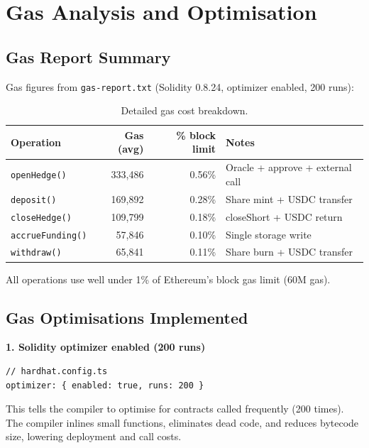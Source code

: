 \documentclass[11pt,a4paper]{article}
\begin{document}
\section{Gas Analysis and Optimisation}

\subsection{Gas Report Summary}

Gas figures from \texttt{gas-report.txt} (Solidity 0.8.24, optimizer enabled, 200 runs):

\begin{table}[h!]
\centering
\caption{Detailed gas cost breakdown.}
\begin{tabular}{@{}lrrl@{}}
\toprule
\textbf{Operation} & \textbf{Gas (avg)} & \textbf{\% block limit} & \textbf{Notes} \\
\midrule
\texttt{openHedge()}     & 333,486 & 0.56\% & Oracle + approve + external call \\
\texttt{deposit()}       & 169,892 & 0.28\% & Share mint + USDC transfer \\
\texttt{closeHedge()}    & 109,799 & 0.18\% & closeShort + USDC return \\
\texttt{accrueFunding()} &  57,846 & 0.10\% & Single storage write \\
\texttt{withdraw()}      &  65,841 & 0.11\% & Share burn + USDC transfer \\
\bottomrule
\end{tabular}
\end{table}

All operations use well under 1\% of Ethereum's block gas limit (60M gas).

\subsection{Gas Optimisations Implemented}

\textbf{1. Solidity optimizer enabled (200 runs)}

\begin{lstlisting}[style=javascript, caption={Optimizer configuration in \texttt{hardhat.config.ts}.}]
// hardhat.config.ts
optimizer: { enabled: true, runs: 200 }
\end{lstlisting}

This tells the compiler to optimise for contracts called frequently (200 times). The compiler inlines small functions, eliminates dead code, and reduces bytecode size, lowering deployment and call costs.
\end{document}
